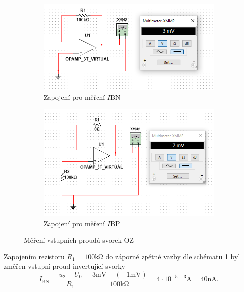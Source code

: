 \documentclass[twoside]{article}
\begin{document}
\begin{figure}
    \centering
    \begin{subfigure}{0.45 \textwidth}
        \includegraphics[width=\linewidth]{sledovac_IBN.png}
        \caption{Zapojení pro měření $I\text{BN}$}
        \label{fig:sledovac_IBN}        
    \end{subfigure}
    \begin{subfigure}{0.45\textwidth}
        \includegraphics[width=\linewidth]{sledovac_IBP.png}
        \caption{Zapojení pro měření $I\text{BP}$}
        \label{fig:sledovac_IBP}
    \end{subfigure} \hfil
    \caption{Měření vstupních proudů svorek OZ}
\end{figure}

Zapojením rezistoru $R_1 = 100 \si{\kilo\ohm}$ do záporné zpětné vazby dle schématu \ref{fig:sledovac_IBN} byl změřen
vstupní proud invertující svorky
\begin{equation}
    I_\text{BN} = \frac{u_2 - U_0}{R_1} = \frac{3 \si{\milli\volt} - (-1 \si{\milli\volt})}{100 \si{\kilo\ohm}}
    = 4 \cdot 10^{-5-3} \si{\ampere} = 40 \si{\nano\ampere}.
\end{equation}
\end{document}
